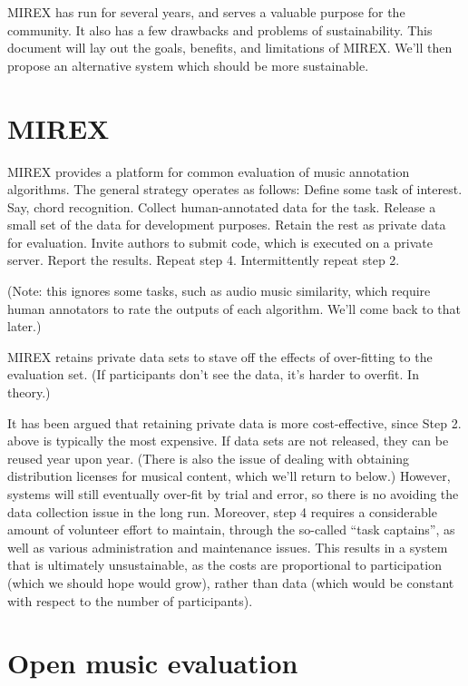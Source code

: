 \documentclass{article}
\begin{document}
MIREX has run for several years, and serves a valuable purpose for the community.  It also has a few drawbacks and problems of sustainability.  This document will lay out the goals, benefits, and limitations of MIREX.  We’ll then propose an alternative system which should be more sustainable.


\section{MIREX}

MIREX provides a platform for common evaluation of music annotation algorithms.  The general strategy operates as follows:
Define some task of interest.  Say, chord recognition.
Collect human-annotated data for the task.
Release a small set of the data for development purposes.  Retain the rest as private data for evaluation.
Invite authors to submit code, which is executed on a private server.  Report the results.
Repeat step 4.  Intermittently repeat step 2.

(Note: this ignores some tasks, such as audio music similarity, which require human annotators to rate the outputs of each algorithm.  We’ll come back to that later.)

MIREX retains private data sets to stave off the effects of over-fitting to the evaluation set. (If participants don’t see the data, it’s harder to overfit.  In theory.)

It has been argued that retaining private data is more cost-effective, since Step 2. above is typically the most expensive.  If data sets are not released, they can be reused year upon year.  (There is also the issue of dealing with obtaining distribution licenses for musical content, which we’ll return to below.)  However, systems will still eventually over-fit by trial and error, so there is no avoiding the data collection issue in the long run.  Moreover, step 4 requires a considerable amount of volunteer effort to maintain, through the so-called “task captains”, as well as various administration and maintenance issues.  This results in a system that is ultimately unsustainable, as the costs are proportional to participation (which we should hope would grow), rather than data (which would be constant with respect to the number of participants).


\section{Open music evaluation}
\end{document}
